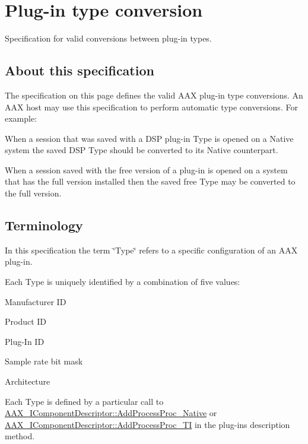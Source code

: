 \hypertarget{a00826}{}\section{Plug-\/in type conversion}
\label{a00826}
Specification for valid conversions between plug-\/in types. 

\hypertarget{a00826_advancedTopics_relatedTypes_about}{}\subsection{About this specification}\label{a00826_advancedTopics_relatedTypes_about}
The specification on this page defines the valid A\+AX plug-\/in type conversions. An A\+AX host may use this specification to perform automatic type conversions. For example\+: 
\begin{DoxyItemize}
\item When a session that was saved with a D\+SP plug-\/in Type is opened on a Native system the saved D\+SP Type should be converted to its Native counterpart.  
\item When a session saved with the free version of a plug-\/in is opened on a system that has the full version installed then the saved free Type may be converted to the full version.  
\end{DoxyItemize}\hypertarget{a00826_advancedTopics_relatedTypes_terminology}{}\subsection{Terminology}\label{a00826_advancedTopics_relatedTypes_terminology}
In this specification the term \char`\"{}\+Type\char`\"{} refers to a specific configuration of an A\+AX plug-\/in.

Each Type is uniquely identified by a combination of five values\+: 
\begin{DoxyItemize}
\item Manufacturer ID  
\item Product ID  
\item Plug-\/\+In ID  
\item Sample rate bit mask  
\item Architecture  
\end{DoxyItemize}

Each Type is defined by a particular call to \mbox{\hyperlink{a01781_a1c069508cf54a523905c8160ebf628ad}{A\+A\+X\+\_\+\+I\+Component\+Descriptor\+::\+Add\+Process\+Proc\+\_\+\+Native}} or \mbox{\hyperlink{a01781_a38f7fb30a378a17ce9635f5c36100a3b}{A\+A\+X\+\_\+\+I\+Component\+Descriptor\+::\+Add\+Process\+Proc\+\_\+\+TI}} in the plug-\/in\textquotesingle{}s description method.

